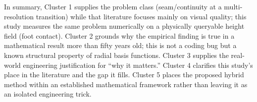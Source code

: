In summary, Cluster 1 supplies the problem class (seam/continuity at a
multi-resolution transition) while that literature focuses mainly on
visual quality; this study measures the same problem numerically on a
physically queryable height field (foot contact). Cluster 2 grounds why
the empirical finding is true in a mathematical result more than fifty
years old; this is not a coding bug but a known structural property of
radial basis functions. Cluster 3 supplies the real-world engineering
justification for ``why it matters.'' Cluster 4 clarifies this study's
place in the literature and the gap it fills. Cluster 5 places the
proposed hybrid method within an established mathematical framework
rather than leaving it as an isolated engineering trick.
